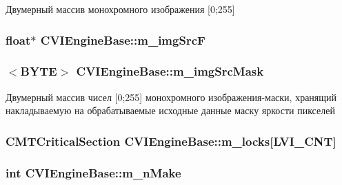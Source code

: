 Двумерный массив монохромного изображения \mbox{[}0;255\mbox{]} 

\hypertarget{class_c_v_i_engine_base_a359f07597366b8c81727c32c9ff931be}{
\subsubsection[{m\+\_\+img\+Src\+F}]{\setlength{\rightskip}{0pt plus 5cm}float$\ast$ C\+V\+I\+Engine\+Base\+::m\+\_\+img\+Src\+F}}\label{class_c_v_i_engine_base_a359f07597366b8c81727c32c9ff931be}




\hypertarget{class_c_v_i_engine_base_a879bfc4065da678c4ca67ed828b05a05}{
\subsubsection[{m\+\_\+img\+Src\+Mask}]{$<$B\+Y\+T\+E$>$ C\+V\+I\+Engine\+Base\+::m\+\_\+img\+Src\+Mask}}\label{class_c_v_i_engine_base_a879bfc4065da678c4ca67ed828b05a05}


Двумерный массив чисел \mbox{[}0;255\mbox{]} монохромного изображения-\/маски, хранящий накладываемую на обрабатываемые исходные данные маску яркости пикселей 

\hypertarget{class_c_v_i_engine_base_a66562cd6aaf7fd0f9ade29c9096b9851}{
\subsubsection[{m\+\_\+locks}]{\setlength{\rightskip}{0pt plus 5cm}C\+M\+T\+Critical\+Section C\+V\+I\+Engine\+Base\+::m\+\_\+locks\mbox{[}L\+V\+I\+\_\+\+C\+N\+T\mbox{]}}}\label{class_c_v_i_engine_base_a66562cd6aaf7fd0f9ade29c9096b9851}




\hypertarget{class_c_v_i_engine_base_a4f173a318d25c068952f2c68f4248208}{
\subsubsection[{m\+\_\+n\+Make}]{\setlength{\rightskip}{0pt plus 5cm}int C\+V\+I\+Engine\+Base\+::m\+\_\+n\+Make}}\label{class_c_v_i_engine_base_a4f173a318d25c068952f2c68f4248208}




